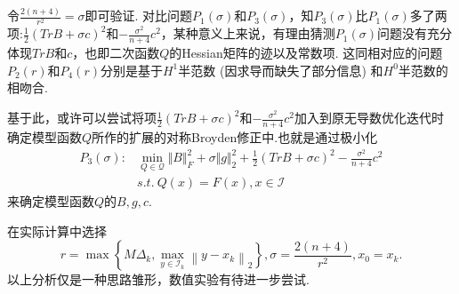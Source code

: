 \documentclass[UTF8]{ctexart}
\begin{document}
%
令$\frac{2(n+4)}{r^2}=\sigma$即可验证. 对比问题$P_1(\sigma)$和$P_3(\sigma)$，知$P_3(\sigma)$比$P_1(\sigma)$多了两项:$\frac{1}{2}(TrB+\sigma c)^{2}$和$-\frac{\sigma^2}{n+4}c^2$，某种意义上来说，有理由猜测$P_1(\sigma)$问题没有充分体现$TrB$和$c$，也即二次函数$Q$的Hessian矩阵的迹以及常数项. 这同相对应的问题$P_2(r)$和$P_4(r)$分别是基于$H^1$半范数 (因求导而缺失了部分信息) 和$H^0$半范数的相吻合.

基于此，或许可以尝试将项$\frac{1}{2}(TrB+\sigma c)^{2}$和$-\frac{\sigma^2}{n+4}c^2$加入到原无导数优化迭代时确定模型函数$Q$所作的扩展的对称Broyden修正中.也就是通过极小化
\begin{align*}
P_{3}(\sigma):&\mathop{\min}\limits_{Q\in\mathcal{Q}}\Vert B\Vert^{2}_{F}+\sigma\Vert g\Vert^{2}_{2}+\frac{1}{2}(TrB+\sigma c)^{2}-\frac{\sigma^2}{n+4}c^2\\
&s.t. \  Q(x)=F(x), x\in \mathcal{I}
\end{align*}
来确定模型函数$Q$的$B,g,c$.

在实际计算中选择
$$
r=\max \left\{M \Delta_{k}, \max _{y \in \mathcal{I}_{k}}\left\|y-x_{k}\right\|_{2}\right\}, 
\sigma=\frac{2(n+4)}{r^2}, x_0=x_k.
$$
以上分析仅是一种思路雏形，数值实验有待进一步尝试.
\end{document}
